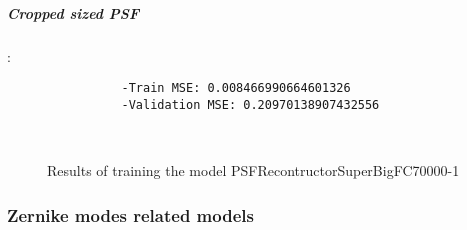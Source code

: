 		\subparagraph{Cropped sized PSF}:\\
		\begin{lstlisting}	
        		-Train MSE: 0.008466990664601326
        		-Validation MSE: 0.20970138907432556
		\end{lstlisting}
		
		\begin{figure*}[ht!]
			\hspace{\fill}
			\hspace{\fill}
			\\
			\caption{Results of training the model PSFRecontructorSuperBigFC70000-1}
		\end{figure*}
	
\FloatBarrier

	\subsubsection{Zernike modes related models}
	

